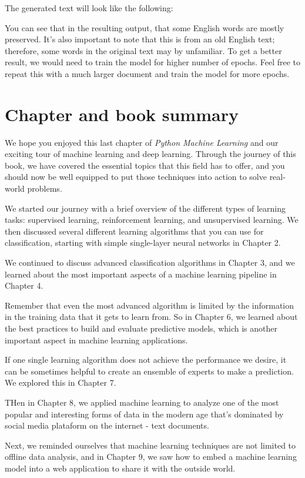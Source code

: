 \documentclass[11pt]{article}
\begin{document}
    The generated text will look like the following:

    You can see that in the resulting output, that some English words are
mostly preserved. It's also important to note that this is from an old
English text; therefore, some words in the original text may by
unfamiliar. To get a better result, we would need to train the model for
higher number of epochs. Feel free to repeat this with a much larger
document and train the model for more epochs.

    \section{Chapter and book summary}\label{chapter-and-book-summary}

    We hope you enjoyed this last chapter of \emph{Python Machine Learning}
and our exciting tour of machine learning and deep learning. Through the
journey of this book, we have covered the essential topics that this
field has to offer, and you should now be well equipped to put those
techniques into action to solve real-world problems.

We started our journey with a brief overview of the different types of
learning tasks: supervised learning, reinforcement learning, and
unsupervised learning. We then discussed several different learning
algorithms that you can use for classification, starting with simple
single-layer neural networks in Chapter 2.

We continued to discuss advanced classification algorithms in Chapter 3,
and we learned about the most important aspects of a machine learning
pipeline in Chapter 4.

Remember that even the most advanced algorithm is limited by the
information in the training data that it gets to learn from. So in
Chapter 6, we learned about the best practices to build and evaluate
predictive models, which is another important aspect in machine learning
applications.

If one single learning algorithm does not achieve the performance we
desire, it can be sometimes helpful to create an ensemble of experts to
make a prediction. We explored this in Chapter 7.

THen in Chapter 8, we applied machine learning to analyze one of the
most popular and interesting forms of data in the modern age that's
dominated by social media plataform on the internet - text documents.

Next, we reminded ourselves that machine learning techniques are not
limited to offline data analysis, and in Chapter 9, we saw how to embed
a machine learning model into a web application to share it with the
outside world.
\end{document}

